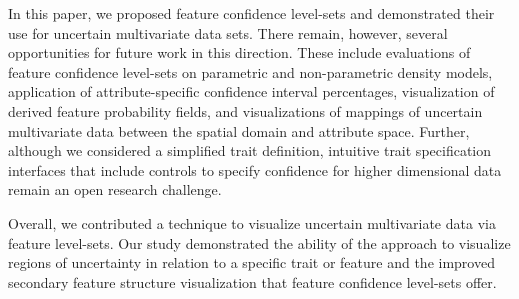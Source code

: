 In this paper, we proposed feature confidence level-sets and demonstrated their use for uncertain multivariate data sets.
%
There remain, however, several opportunities for future work in this direction.
%
These include evaluations of feature confidence level-sets on
parametric and non-parametric density models, application of attribute-specific confidence interval percentages, 
visualization of derived feature probability fields, and visualizations of mappings of uncertain multivariate data between the spatial domain and attribute space.
%
Further, although we considered a simplified trait definition, intuitive trait specification interfaces 
that include controls to specify confidence for higher dimensional data remain an open research challenge. 

Overall, we contributed a technique to visualize uncertain multivariate data via feature level-sets.
%
Our study demonstrated the ability of the approach to visualize regions of uncertainty in relation to a specific trait or feature and the improved secondary feature structure visualization that feature confidence level-sets offer.

